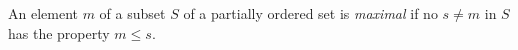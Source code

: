 An element $m$ of a subset $S$ of a partially ordered set is \textit{maximal} if no $s \neq m$ in $S$ has the property $m \leq s$.
